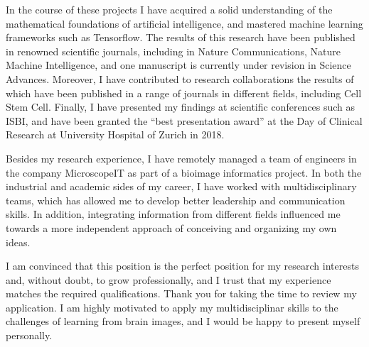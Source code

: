 \documentclass[10pt, letter]{ag-cv} %
\begin{document}
\begin{cvletter}
\begin{flushleft}
In the course of these projects I have acquired a solid understanding of the mathematical foundations of artificial intelligence, and mastered machine learning frameworks such as Tensorflow. The results of this research have been published in renowned scientific journals, including in Nature Communications, Nature Machine Intelligence, and one manuscript is currently under revision in Science Advances. Moreover, I have contributed to research collaborations the results of which have been published in a range of journals in different fields, including Cell Stem Cell. Finally, I have presented my findings at scientific conferences such as ISBI, and have been granted the “best presentation award” at the Day of Clinical Research at University Hospital of Zurich in 2018. 

Besides my research experience, I have remotely managed a team of engineers in the company MicroscopeIT as part of a bioimage informatics project. In both the industrial and academic sides of my career, I have worked with multidisciplinary teams, which has allowed me to develop better leadership and communication skills. In addition, integrating information from different fields influenced me towards a more independent approach of conceiving and organizing my own ideas. 

I am convinced that this position is the perfect position for my research interests and, without doubt, to grow professionally, and I trust that my experience matches the required qualifications. Thank you for taking the time to review my application. I am highly motivated to apply my multidisciplinar skills to the challenges of learning from brain images, and I would be happy to present myself personally. 



\end{flushleft}

\end{cvletter}


\makeletterclosing %
\end{document}
